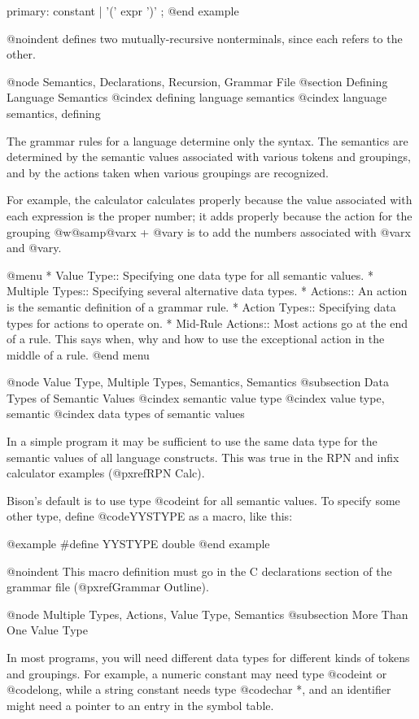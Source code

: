 {{{{{{{{{{{{{{{{{{primary:  constant
        | '(' expr ')'
        ;
@end example

@noindent
defines two mutually-recursive nonterminals, since each refers to the
other.

@node Semantics, Declarations, Recursion, Grammar File
@section Defining Language Semantics
@cindex defining language semantics
@cindex language semantics, defining 

The grammar rules for a language determine only the syntax.  The semantics
are determined by the semantic values associated with various tokens and
groupings, and by the actions taken when various groupings are recognized.

For example, the calculator calculates properly because the value
associated with each expression is the proper number; it adds properly
because the action for the grouping @w{@samp{@var{x} + @var{y}}} is to add
the numbers associated with @var{x} and @var{y}.

@menu
* Value Type::       Specifying one data type for all semantic values.
* Multiple Types::   Specifying several alternative data types.
* Actions::          An action is the semantic definition of a grammar rule.
* Action Types::     Specifying data types for actions to operate on.
* Mid-Rule Actions:: Most actions go at the end of a rule.
                      This says when, why and how to use the exceptional
                      action in the middle of a rule.
@end menu

@node Value Type, Multiple Types, Semantics, Semantics
@subsection Data Types of Semantic Values
@cindex semantic value type
@cindex value type, semantic
@cindex data types of semantic values

In a simple program it may be sufficient to use the same data type for
the semantic values of all language constructs.  This was true in the
RPN and infix calculator examples (@pxref{RPN Calc}).

Bison's default is to use type @code{int} for all semantic values.  To
specify some other type, define @code{YYSTYPE} as a macro, like this:

@example
#define YYSTYPE double
@end example

@noindent
This macro definition must go in the C declarations section of the grammar
file (@pxref{Grammar Outline}).

@node Multiple Types, Actions, Value Type, Semantics
@subsection More Than One Value Type

In most programs, you will need different data types for different kinds
of tokens and groupings.  For example, a numeric constant may need type
@code{int} or @code{long}, while a string constant needs type @code{char *},
and an identifier might need a pointer to an entry in the symbol table.

}}}}}}}}}}}}}}}}}}
